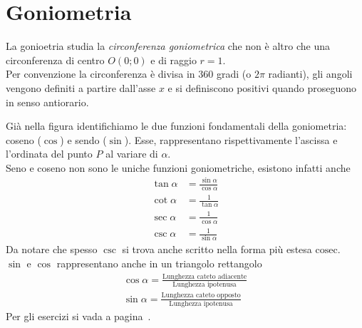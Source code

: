 
\section{Goniometria}\label{sec:goniometria}
La gonioetria studia la \emph{circonferenza goniometrica} che non è altro che una circonferenza di 
centro $O(0;0)$ e di raggio $r=1$.\\
Per convenzione la circonferenza è divisa in $360$ gradi (o $2\pi$ radianti), gli angoli vengono 
definiti a partire dall'asse $x$ e si definiscono positivi quando proseguono in senso antiorario. 
\begin{center}
\end{center}
Già nella figura identifichiamo le due funzioni fondamentali della goniometria: coseno ($\cos$) e 
sendo ($\sin$). Esse, rappresentano rispettivamente l'ascissa e l'ordinata del punto $P$ al variare
di  $\alpha$.\\
Seno e coseno non sono le uniche funzioni goniometriche, esistono infatti anche
\begin{align*}
  \tan\alpha &= \frac{\sin\alpha}{\cos\alpha}\\
  \cot\alpha &= \frac{1}{\tan\alpha}\\
  \sec\alpha &= \frac{1}{\cos\alpha}\\
  \csc\alpha &= \frac{1}{\sin\alpha}
\end{align*}
Da notare che spesso $\csc$ si trova anche scritto nella forma più estesa $\mathrm{cosec}$.\\
$\sin$ e $\cos$ rappresentano anche in un triangolo rettangolo
\begin{gather*}
  \cos\alpha = \frac{\text{Lunghezza cateto adiacente}}{\text{Lunghezza ipotenusa}}\\
  \sin\alpha = \frac{\text{Lunghezza cateto opposto}}{\text{Lunghezza ipotenusa}}
\end{gather*}
Per gli esercizi si vada a pagina~\pageref{ex:goniometria}.


